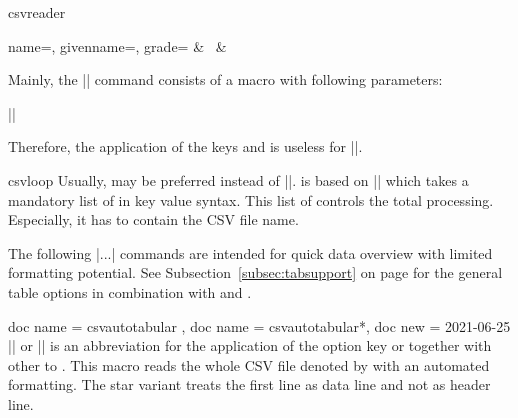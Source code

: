 \documentclass[a4paper,11pt]{ltxdoc}
\begin{document}
\begin{docCommand}{csvreader}{}
\begin{dispExample}
%
  {name=\name, givenname=\firstname, grade=\grade}{%
    \grade & \firstname~\name & \csvcoliii
  }
\end{dispExample}

Mainly, the |\csvreader| command consists of a  macro with
following parameters:\par
||\par
  Therefore, the application of the keys  and 
is useless for |\csvreader|.
\end{docCommand}


\clearpage
\begin{docCommand}{csvloop}{}
  Usually,  may be preferred instead of |\csvloop|.
   is based on |\csvloop| which takes a mandatory list of
   in key value syntax.
  This list of  controls the total processing. Especially,
  it has to contain the CSV file name.
\begin{dispExample}
\end{dispExample}
\end{docCommand}

\bigskip

The following |\csvauto...| commands are intended for quick data overview
with limited formatting potential.
See Subsection~\ref{subsec:tabsupport} on page \pageref{subsec:tabsupport}
for the general table options in combination with  and
.

\begin{docCommands}[
    doc parameter = \oarg{options}\marg{file name}
  ]
  {
    { doc name = csvautotabular  },
    { doc name = csvautotabular*, doc new = 2021-06-25 }
  }
  |\csvautotabular| or |\csvautotabular*|
  is an abbreviation for the application of the option key
   or 
  together with other  to .
  This macro reads the whole CSV file denoted by 
  with an automated formatting.
  The star variant treats the first line as data line and not as header line.
\begin{dispExample}
\end{dispExample}
\begin{dispExample}
\end{dispExample}
\end{docCommands}
\end{document}
